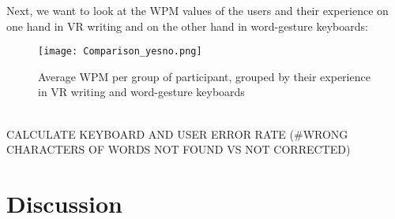 Next, we want to look at the WPM values of the users and their experience on one hand in VR writing and on the other hand in word-gesture keyboards:\\
\begin{figure}
    \centering
    \texttt{[image: Comparison\_yesno.png]}
    \caption{Average WPM per group of participant, grouped by their experience in VR writing and word-gesture keyboards}
    \label{fig:WPM_yesno}
\end{figure}
\\

CALCULATE KEYBOARD AND USER ERROR RATE (\#WRONG CHARACTERS OF WORDS NOT FOUND VS NOT CORRECTED)

\section{Discussion}